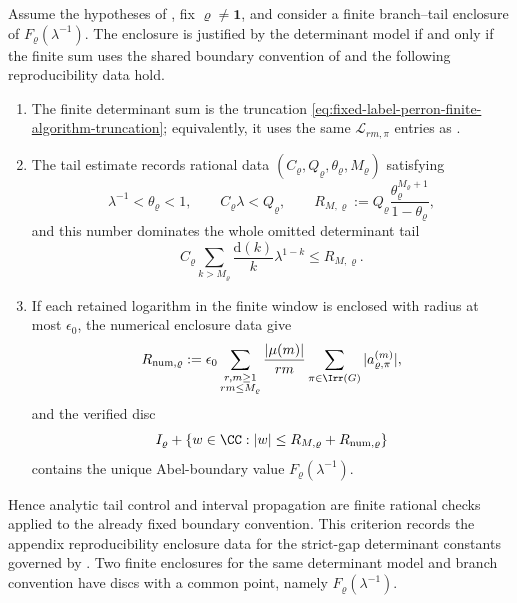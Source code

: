 \begin{lemma}
  \label{prop:fixed-label-branch-tail-record}
  \label{prop:main-iii-boundary-determinant-convention}
  \label{prop:fixed-label-certificate-compression}
  \label{prop:fixed-label-product-rational-enclosures}
  Assume the hypotheses of , fix
  \(\varrho\ne\mathbf1\), and consider a finite branch--tail enclosure of
  \(F_\varrho(\lambda^{-1})\).  The enclosure is justified by the determinant
  model if and only if the finite sum uses the shared boundary convention of
   and the following
  reproducibility data hold.
  \begin{enumerate}[label=\textup{(\roman*)},leftmargin=*]
    \item The finite determinant sum is the truncation
      \eqref{eq:fixed-label-perron-finite-algorithm-truncation}; equivalently,
      it uses the same \(\mathcal L_{rm,\pi}\) entries as
      .
    \item The tail estimate records rational data
      \((C_\varrho,Q_\varrho,\theta_\varrho,M_\varrho)\) satisfying
      \[
        \lambda^{-1}<\theta_\varrho<1,
        \qquad C_\varrho\lambda<Q_\varrho,
        \qquad
        R_{M,\varrho}:=
        Q_\varrho\frac{\theta_\varrho^{M_\varrho+1}}{1-\theta_\varrho},
      \]
      and this number dominates the whole omitted determinant tail
      \[
        C_\varrho
        \sum_{k>M_\varrho}\frac{\mathrm d(k)}{k}\lambda^{1-k}
        \le R_{M,\varrho}.
      \]
    \item If each retained logarithm in the finite window is enclosed
      with radius at most \(\epsilon_0\), the numerical enclosure data give
      \[
        R_{\mathrm{num},\varrho}:=
        \epsilon_0
        \sum_{\substack{r,m\ge1\\rm\le M_\varrho}}
          \frac{|\mu(m)|}{rm}
          \sum_{\pi\in\Irr(G)}|a_{\varrho,\pi}^{(m)}|,
      \]
      and the verified disc
      \[
        I_\varrho+
        \{w\in\CC:|w|\le R_{M,\varrho}+R_{\mathrm{num},\varrho}\}
      \]
      contains the unique Abel-boundary value \(F_\varrho(\lambda^{-1})\).
  \end{enumerate}
  Hence analytic tail control and interval propagation are finite rational
  checks applied to the already fixed boundary convention.  This criterion
  records the appendix reproducibility enclosure data for the strict-gap
  determinant constants governed by .
  Two finite enclosures for the same determinant model and branch convention
  have discs with a common point, namely \(F_\varrho(\lambda^{-1})\).
\end{lemma}

